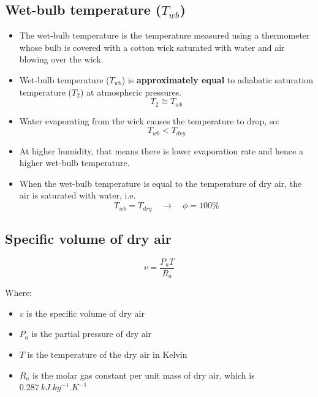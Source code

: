 \documentclass[11pt]{article}
\begin{document}
\subsection{Wet-bulb temperature (\(T_{wb}\))}
\label{sec:org342a1a6}
\begin{itemize}
\item The wet-bulb temperature is the temperature measured using a thermometer whose bulb is covered with a cotton wick saturated with water and air blowing over the wick.
\item Wet-bulb temperature (\(T_{wb}\)) is \textbf{approximately equal} to adiabatic saturation temperature (\(T_2\)) at atmospheric pressures.
\[T_2 \cong T_{wb}\]
\item Water evaporating from the wick causes the temperature to drop, so:
\[T_{wb} < T_{dry}\]
\item At higher humidity, that means there is lower evaporation rate and hence a higher wet-bulb temperature.
\item When the wet-bulb temperature is equal to the temperature of dry air, the air is saturated with water, i.e.
\[T_{wb} = T_{dry} \quad \rightarrow \quad \phi = 100\%\]
\end{itemize}
\subsection{Specific volume of dry air}
\label{sec:org22baf4d}
\[v = \frac{P_a T}{R_a}\]

Where:
\begin{itemize}
\item \(v\) is the specific volume of dry air
\item \(P_a\) is the partial pressure of dry air
\item \(T\) is the temperature of the dry air in Kelvin
\item \(R_{a}\) is the molar gas constant per unit mass of dry air, which is \(\qty{0.287}{kJ.kg^{-1}.K^{-1}}\)
\end{itemize}

 \newpage
\end{document}
